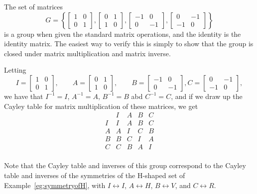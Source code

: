 \begin{example}
  The set of matrices
  \[
    G = \left\{
      \begin{bmatrix}
        1 & 0 \\
        0 & 1
      \end{bmatrix},
      \begin{bmatrix}
        0 & 1 \\
        1 & 0
      \end{bmatrix},
      \begin{bmatrix}
        -1 & 0 \\
        0 & -1
      \end{bmatrix},
      \begin{bmatrix}
        0 & -1 \\
        -1 & 0
      \end{bmatrix}
    \right\}
  \]
  is a group when given the standard matrix operations, and the identity is
  the identity matrix.  The easiest way to verify this is simply to show that
  the group is closed under matrix multiplication and matrix inverse.
  
  Letting
  \[
    I = \begin{bmatrix}
        1 & 0 \\
        0 & 1
      \end{bmatrix}, \qquad
    A = \begin{bmatrix}
        0 & 1 \\
        1 & 0
      \end{bmatrix}, \qquad
    B = \begin{bmatrix}
        -1 & 0 \\
        0 & -1
      \end{bmatrix},
    C = \begin{bmatrix}
        0 & -1 \\
        -1 & 0
      \end{bmatrix},
  \]
  we have that $I^{-1} = I$, $A^{-1} = A$, $B^{-1} = B$ abd $C^{-1} = C$, and
  if we draw up the Cayley table for matrix multiplication of these matrices,
  we get
  \[
    \begin{array}{c|cccc}
        & I & A & B & C \\
      \hline
      I & I & A & B & C \\
      A & A & I & C & B \\
      B & B & C & I & A \\
      C & C & B & A & I \\
    \end{array}
  \]
  
  Note that the Cayley table and inverses of this group correspond to the
  Cayley table and inverses of the symmetries of the \textsf{H}-shaped set
  of Example~\ref{eg:symmetryofH}, with $I \leftrightarrow I$, $A \leftrightarrow H$,
  $B \leftrightarrow V$, and $C \leftrightarrow R$.
\end{example}

